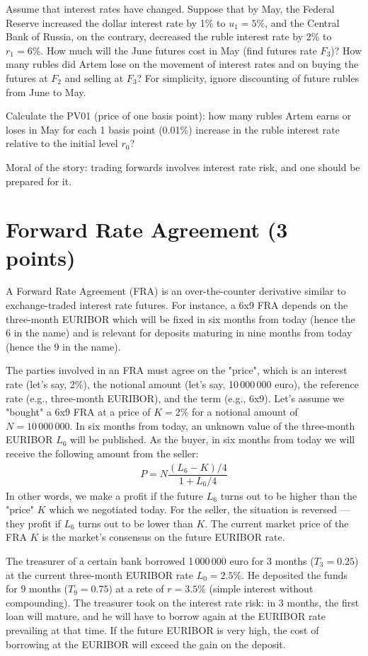 \documentclass[a4paper,14pt]{extarticle}
\begin{document}
Assume that interest rates have changed. Suppose that by May, the Federal Reserve increased the dollar interest rate by 1\% to $u_1=5\%$, and the Central Bank of Russia, on the contrary, decreased the ruble interest rate by 2\% to $r_1=6\%$. How much will the June futures cost in May (find futures rate $F_3$)? How many rubles did Artem lose on the movement of interest rates and on buying the futures at $F_2$ and selling at $F_3$? For simplicity, ignore discounting of future rubles from June to May.

Calculate the PV01 (price of one basis point): how many rubles Artem earns or loses in May for each 1 basis point (0.01\%) increase in the ruble interest rate relative to the initial level $r_0$?

Moral of the story: trading forwards involves interest rate risk, and one should be prepared for it.

\section{Forward Rate Agreement (3 points)}

A Forward Rate Agreement (FRA) is an over-the-counter derivative similar to exchange-traded interest rate futures. For instance, a 6x9 FRA depends on the three-month EURIBOR which will be fixed in six months from today (hence the 6 in the name) and is relevant for deposits maturing in nine months from today (hence the 9 in the name).

The parties involved in an FRA must agree on the "price", which is an interest rate (let's say, 2\%), the notional amount (let's say, 10\,000\,000 euro), the reference rate (e.g., three-month EURIBOR), and the term (e.g., 6x9). Let's assume we "bought" a 6x9 FRA at a price of $K=2\%$ for a notional amount of $N=10\,000\,000$. In six months from today, an unknown value of the three-month EURIBOR $L_6$ will be published. As the buyer, in six months from today we will receive the following amount from the seller:
\begin{align*}
P = N\dfrac{(L_6 - K)/4}{1 + L_6/4}
\end{align*}
In other words, we make a profit if the future $L_6$ turns out to be higher than the "price" $K$ which we negotiated today. For the seller, the situation is reversed --- they profit if $L_6$ turns out to be lower than $K$. The current market price of the FRA $K$ is the market's consensus on the future EURIBOR rate.

The treasurer of a certain bank borrowed 1\,000\,000 euro for 3 months ($T_3 = 0.25$) at the current three-month EURIBOR rate $L_0=2.5\%$. He deposited the funds for 9 months ($T_9 = 0.75$) at a rete of $r=3.5\%$ (simple interest without compounding). The treasurer took on the interest rate risk: in 3 months, the first loan will mature, and he will have to borrow again at the EURIBOR rate prevailing at that time. If the future EURIBOR is very high, the cost of borrowing at the EURIBOR will exceed the gain on the deposit.
\end{document}
